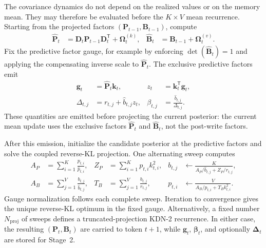 \documentclass[11pt]{article}
\newcommand{\ve}[1]{\boldsymbol{#1}}
\newcommand{\tr}{\mathsf{T}}
\begin{document}
The covariance dynamics do not depend on the realized values or on the memory mean.  They may
therefore be evaluated before the $K\times V$ mean recurrence.  Starting from the projected
factors $(\ve{P}_{t-1},\ve{B}_{t-1})$, compute
\begin{equation}
\begin{aligned}
  \widehat{\ve{P}}_t
  &=\ve{D}_t\ve{P}_{t-1}\ve{D}_t^{\tr}
    +\ve{\Omega}^{(k)}_t,
  &
  \widehat{\ve{B}}_t
  &=\ve{B}_{t-1}+\ve{\Omega}^{(v)}_t.
\end{aligned}
  \label{eq:kdn2-chunk-factor-prediction}
\end{equation}
Fix the predictive factor gauge, for example by enforcing
$\det(\widehat{\ve{B}}_t)=1$ and applying the compensating inverse scale to
$\widehat{\ve{P}}_t$.  The exclusive predictive factors emit
\begin{equation}
\begin{aligned}
  \ve{g}_t
  &=\widehat{\ve{P}}_t\ve{k}_t,
  &
  z_t
  &=\ve{k}_t^{\tr}\ve{g}_t,
  \\
  \Delta_{t,j}
  &=r_{t,j}+\widehat b_{t,j}z_t,
  &
  \beta_{t,j}
  &=\frac{\widehat b_{t,j}}{\Delta_{t,j}}.
\end{aligned}
  \label{eq:kdn2-chunk-factor-emissions}
\end{equation}
These quantities are emitted before projecting the current posterior: the current mean update
uses the exclusive factors $\widehat{\ve{P}}_t$ and $\widehat{\ve{B}}_t$, not the post-write
factors.

After this emission, initialize the candidate posterior at the predictive factors and solve the
coupled reverse-KL projection.  One alternating sweep computes
\begin{equation}
\begin{aligned}
  A_P&=\sum_{i=1}^{K}\frac{p_{t,i}}{\widehat p_{t,i}},
  &
  Z_P&=\sum_{i=1}^{K}p_{t,i}k_{t,i}^{2},
  &
  b_{t,j}
  &\leftarrow
  \frac{K}{A_P/\widehat b_{t,j}+Z_P/r_{t,j}},
  \\
  A_B&=\sum_{j=1}^{V}\frac{b_{t,j}}{\widehat b_{t,j}},
  &
  T_B&=\sum_{j=1}^{V}\frac{b_{t,j}}{r_{t,j}},
  &
  p_{t,i}
  &\leftarrow
  \frac{V}{A_B/\widehat p_{t,i}+T_Bk_{t,i}^{2}}.
\end{aligned}
  \label{eq:kdn2-chunk-factor-projection}
\end{equation}
Gauge normalization follows each complete sweep.  Iteration to convergence gives the unique
reverse-KL optimum in the fixed gauge.  Alternatively, a fixed number
$N_{\mathrm{proj}}$ of sweeps defines a truncated-projection KDN-2 recurrence.  In either case,
the resulting $(\ve{P}_t,\ve{B}_t)$ are carried to token $t+1$, while
$\ve{g}_t$, $\ve{\beta}_t$, and optionally $\ve{\Delta}_t$ are stored for Stage~2.
\end{document}
